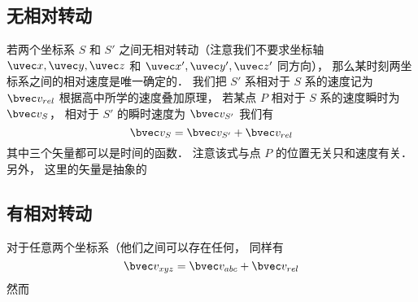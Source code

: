 


\subsection{无相对转动}
若两个坐标系 $S$ 和 $S'$ 之间无相对转动（注意我们不要求坐标轴 $\uvec x, \uvec y, \uvec z$ 和 $\uvec x', \uvec y', \uvec z'$ 同方向）， 那么某时刻两坐标系之间的相对速度是唯一确定的． 我们把 $S'$ 系相对于 $S$ 系的速度记为 $\bvec v_{rel}$ 根据高中所学的速度叠加原理， 若某点 $P$ 相对于 $S$ 系的速度瞬时为 $\bvec v_S$， 相对于 $S'$ 的瞬时速度为 $\bvec v_{S'}$ 我们有
\begin{equation}
\bvec v_{S} = \bvec v_{S'} + \bvec v_{rel}
\end{equation}
其中三个矢量都可以是时间的函数． 注意该式与点 $P$ 的位置无关只和速度有关． 另外， 这里的矢量是抽象的

\subsection{有相对转动}
对于任意两个坐标系（他们之间可以存在任何， 同样有
\begin{equation}
\bvec v_{xyz} = \bvec v_{abc} + \bvec v_{rel}
\end{equation}
然而

